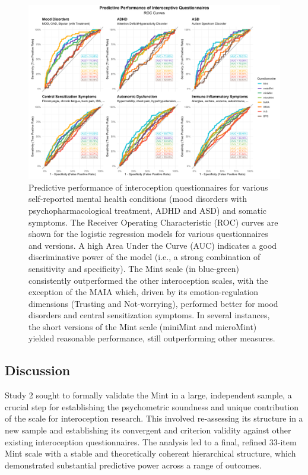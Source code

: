 \documentclass[
  jou,
  floatsintext,
  longtable,
  nolmodern,
  notxfonts,
  notimes,
  colorlinks=true,linkcolor=blue,citecolor=blue,urlcolor=blue]{apa7}
\begin{document}
\begin{figure}[!htbp]

{\caption{{Predictive performance of interoception questionnaires for
various self-reported mental health conditions (mood disorders with
psychopharmacological treatment, ADHD and ASD) and somatic symptoms. The
Receiver Operating Characteristic (ROC) curves are shown for the
logistic regression models for various questionnaires and versions. A
high Area Under the Curve (AUC) indicates a good discriminative power of
the model (i.e., a strong combination of sensitivity and specificity).
The Mint scale (in blue-green) consistently outperformed the other
interoception scales, with the exception of the MAIA which, driven by
its emotion-regulation dimensions (Trusting and Not-worrying), performed
better for mood disorders and central sensitization symptoms. In several
instances, the short versions of the Mint scale (miniMint and microMint)
yielded reasonable performance, still outperforming other
measures.}{\label{fig-six}}}}

\begin{center}
\includegraphics[width=1\linewidth,height=\textheight,keepaspectratio]{../study2/analysis/figures/fig3.png}
\end{center}

\end{figure}

\subsection{Discussion}\label{discussion-1}

Study 2 sought to formally validate the Mint in a large, independent
sample, a crucial step for establishing the psychometric soundness and
unique contribution of the scale for interoception research. This
involved re-assessing its structure in a new sample and establishing its
convergent and criterion validity against other existing interoception
questionnaires. The analysis led to a final, refined 33-item Mint scale
with a stable and theoretically coherent hierarchical structure, which
demonstrated substantial predictive power across a range of outcomes.
\end{document}
